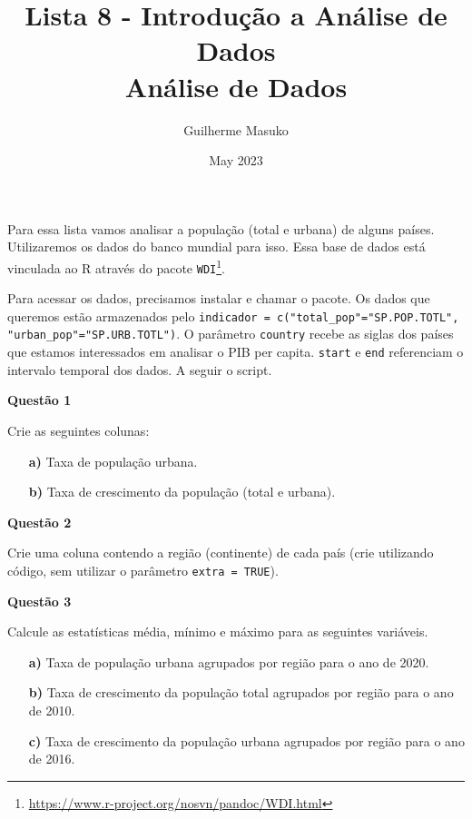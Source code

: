 \documentclass[12pt, a4paper]{article}
\title{Lista 8 - Introdução a Análise de Dados \\
	Análise de Dados}
\author{Guilherme Masuko}
\date{May 2023}
\begin{document}
	
\clearpage
\maketitle
\thispagestyle{empty}

Para essa lista vamos analisar a população (total e urbana) de alguns países. Utilizaremos os dados do banco mundial para isso. Essa base de dados está vinculada ao R através do pacote \texttt{WDI}\footnote{\url{https://www.r-project.org/nosvn/pandoc/WDI.html}}.

Para acessar os dados, precisamos instalar e chamar o pacote. Os dados que queremos estão armazenados pelo \texttt{indicador = c("total\_pop"="SP.POP.TOTL", "urban\_pop"="SP.URB.TOTL")}. O parâmetro \texttt{country} recebe as siglas dos países que estamos interessados em analisar o PIB per capita. \texttt{start} e \texttt{end} referenciam o intervalo temporal dos dados. A seguir o script.





\textbf{Questão 1}

Crie as seguintes colunas:

\begin{itemize}
	\item[\textbf{a)}] Taxa de população urbana.
	
	\item[\textbf{b)}] Taxa de crescimento da população (total e urbana).
	
\end{itemize}



\textbf{Questão 2}

Crie uma coluna contendo a região (continente) de cada país (crie utilizando código, sem utilizar o parâmetro \texttt{extra = TRUE}).



\textbf{Questão 3}

Calcule as estatísticas média, mínimo e máximo para as seguintes variáveis.

\begin{itemize}
	\item[\textbf{a)}] Taxa de população urbana agrupados por região para o ano de 2020.
	
	\item[\textbf{b)}] Taxa de crescimento da população total agrupados por região para o ano de 2010.
	
	\item[\textbf{c)}] Taxa de crescimento da população urbana agrupados por região para o ano de 2016.
	
\end{itemize}
\end{document}
